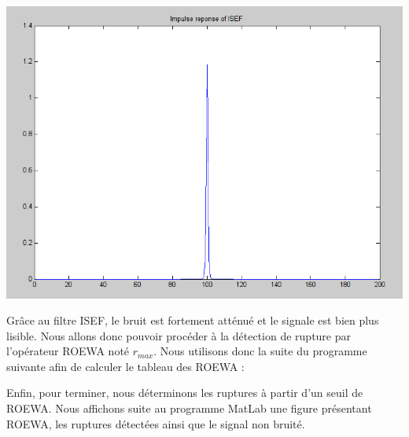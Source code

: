 \documentclass[a4paper,11pt]{article}
\newcommand{\FSource}[1]{%
  
  }
\begin{document}
\vspace{0.5cm}

\FSource{matlab/6.m}

\vspace{0.5cm}

\includegraphics[width=15cm]{capture/filtre.png}


Grâce au filtre ISEF, le bruit est fortement atténué et le signale est bien plus lisible. Nous allons donc pouvoir procéder à la détection de rupture par l'opérateur ROEWA noté $r_{max}$. Nous utilisons donc la suite du programme suivante afin de calculer le tableau des ROEWA :

\vspace{0.5cm}

\FSource{matlab/7.m}

\vspace{0.5cm}


Enfin, pour terminer, nous déterminons les ruptures à partir d'un seuil de ROEWA. Nous affichons suite au programme MatLab une figure présentant ROEWA, les ruptures détectées ainsi que le signal non bruité.

\vspace{0.5cm}

\FSource{matlab/8.m}

\vspace{0.5cm}


\newpage
\end{document}
